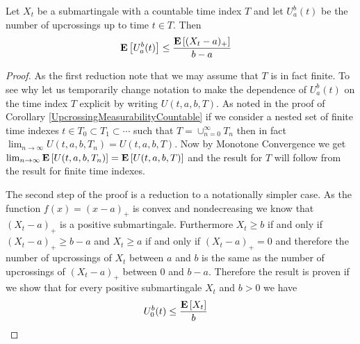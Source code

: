 \begin{lem}\label{UpcrossingInequalityDiscrete}Let $X_t$ be a
  submartingale with a countable time index $T$ and let $U_a^b(t)$ be the number of upcrossings up to
  time $t \in T$.  Then
\begin{align*}
\textbf{E}\left[U_a^b(t)\right] &\leq \frac{\textbf{E}\left[(X_t-a)_+\right]}{b-a}
\end{align*}
\end{lem}
\begin{proof}
As the first reduction note that we may assume that $T$ is in fact
finite.  To see why let us temporarily change notation to make the dependence of $U_a^b(t)$ on the
time index $T$ explicit by writing $U(t, a, b, T)$.  As noted in the
proof of Corollary \ref{UpcrossingMeasurabilityCountable} if we consider a nested set of finite time indexes $t
\in T_0 \subset T_1 \subset \dotsb$ such that $T = \cup_{n=0}^\infty
T_n$ then in fact $\lim_{n \to \infty} U(t, a, b, T_n) = U(t,
a,b,T)$.  Now by Monotone Convergence we get $\lim_{n \to \infty}
\textbf{E}\left[U(t, a, b, T_n)\right] = \textbf{E}\left[ U(t,a,b,T)\right]$ and the
result for $T$ will follow from the result for finite time indexes.

The second step of the proof is a reduction to a notationally simpler
case.  As the function $f(x) = (x -a)_+$ is convex and nondecreasing we know
that $(X_t - a)_+$ is a positive submartingale.  Furthermore $X_t \geq b$ if
and only if $(X_t - a)_+ \geq b-a$ and $X_t \geq a$ if and only if
$(X_t -a)_+ = 0$ and therefore the number of upcrossings of $X_t$
between $a$ and $b$ is the same as the number of upcrossings of $(X_t
- a)_+$ between $0$ and $b-a$.  Therefore the result is proven if we
show that for every positive submartingale $X_t$ and $b>0$ we have 
\begin{align*}
U_0^b (t) &\leq \frac{\textbf{E}\left[X_t\right]}{b}
\end{align*}


\end{proof}
